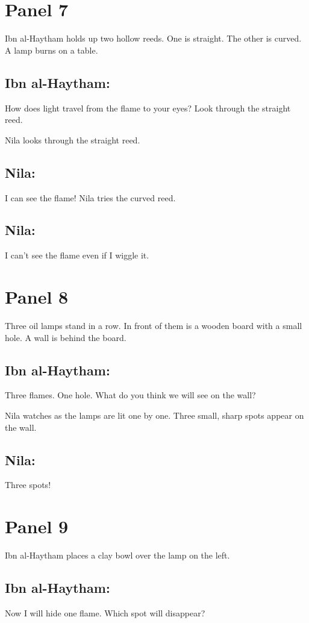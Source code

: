 \documentclass{xtufte-handout}
\begin{document}
\section{Panel 7}
Ibn al-Haytham holds up two hollow reeds. One is straight. The other is curved. A lamp burns on a table.
\subsection{Ibn al-Haytham:} How does light travel from the flame to your eyes? Look through the straight reed.

Nila looks through the straight reed.

\subsection{Nila:} I can see the flame!
Nila tries the curved reed.

\subsection{Nila:} I can't see the flame even if I wiggle it.
\section{Panel 8}
Three oil lamps stand in a row. In front of them is a wooden board with a small hole. A wall is behind the board.
\subsection{Ibn al-Haytham:} Three flames. One hole. What do you think we will see on the wall?

Nila watches as the lamps are lit one by one. Three small, sharp spots appear on the wall.

\subsection{Nila:} Three spots!
\section{Panel 9}
Ibn al-Haytham places a clay bowl over the lamp on the left.
\subsection{Ibn al-Haytham:} Now I will hide one flame. Which spot will disappear?
\end{document}
